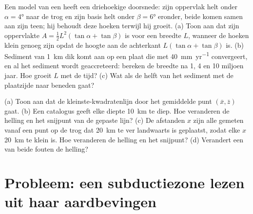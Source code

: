 \begin{exercise}[$\star\star\star$]\label{exo:b1:active-margins:11}
Een model van een  heeft een driehoekige doorsnede: zijn oppervlak helt onder $\alpha = \ang{4}$ naar de trog en zijn basis helt onder $\beta = \ang{6}$ eronder, beide komen samen aan zijn teen; hij behoudt deze hoeken terwijl hij groeit. (a) Toon aan dat zijn oppervlakte $A = \frac12 L^2(\tan\alpha + \tan\beta)$ is voor een breedte $L$, wanneer de hoeken klein genoeg zijn opdat de hoogte aan de achterkant $L(\tan\alpha + \tan\beta)$ is. (b) Sediment van \qty{1}{km} dik komt aan op een plaat die met \qty{40}{mm.yr^{-1}} convergeert, en al het sediment wordt geaccreteerd: bereken de breedte na 1, 4 en 10 miljoen jaar. Hoe groeit $L$ met de tijd? (c) Wat als de helft van het sediment met de plaatzijde naar beneden gaat?
\end{exercise}

\begin{exercise}[$\star\star\star$]\label{exo:b1:active-margins:12}
(a) Toon aan dat de kleinste-kwadratenlijn door het gemiddelde punt $(\bar x, \bar z)$ gaat. (b) Een catalogus geeft elke diepte \qty{10}{km} te diep. Hoe veranderen de helling en het snijpunt van de gepaste lijn? (c) De afstanden $x$ zijn alle gemeten vanaf een punt op de trog dat \qty{20}{km} te ver landwaarts is geplaatst, zodat elke $x$ \qty{20}{km} te klein is. Hoe veranderen de helling en het snijpunt? (d) Verandert een van beide fouten de helling?
\end{exercise}

\section{Probleem: een subductiezone lezen uit haar aardbevingen}

